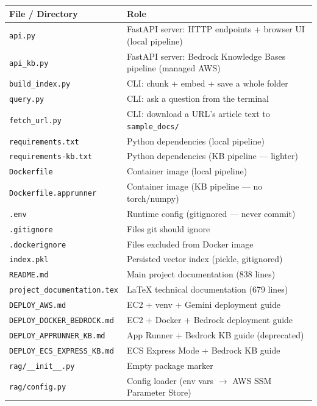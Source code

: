 \documentclass[11pt,a4paper]{paper}
\begin{document}
\begin{table}[h]
\centering
\small
\begin{tabular}{>{\ttfamily}p{5.0cm} >{\raggedright\arraybackslash}p{9.5cm}}
\toprule
\textbf{File / Directory} & \textbf{Role} \\
\midrule
\texttt{api.py} & FastAPI server: HTTP endpoints + browser UI (local pipeline) \\
\texttt{api\_kb.py} & FastAPI server: Bedrock Knowledge Bases pipeline (managed AWS) \\
\texttt{build\_index.py} & CLI: chunk + embed + save a whole folder \\
\texttt{query.py} & CLI: ask a question from the terminal \\
\texttt{fetch\_url.py} & CLI: download a URL's article text to \texttt{sample\_docs/} \\
\texttt{requirements.txt} & Python dependencies (local pipeline) \\
\texttt{requirements-kb.txt} & Python dependencies (KB pipeline — lighter) \\
\texttt{Dockerfile} & Container image (local pipeline) \\
\texttt{Dockerfile.apprunner} & Container image (KB pipeline — no torch/numpy) \\
\texttt{.env} & Runtime config (gitignored — never commit) \\
\texttt{.gitignore} & Files git should ignore \\
\texttt{.dockerignore} & Files excluded from Docker image \\
\texttt{index.pkl} & Persisted vector index (pickle, gitignored) \\
\texttt{README.md} & Main project documentation (838 lines) \\
\texttt{project\_documentation.tex} & LaTeX technical documentation (679 lines) \\
\texttt{DEPLOY\_AWS.md} & EC2 + venv + Gemini deployment guide \\
\texttt{DEPLOY\_DOCKER\_BEDROCK.md} & EC2 + Docker + Bedrock deployment guide \\
\texttt{DEPLOY\_APPRUNNER\_KB.md} & App Runner + Bedrock KB guide (deprecated) \\
\texttt{DEPLOY\_ECS\_EXPRESS\_KB.md} & ECS Express Mode + Bedrock KB guide \\
\texttt{rag/\_\_init\_\_.py} & Empty package marker \\
\texttt{rag/config.py} & Config loader (env vars $\rightarrow$ AWS SSM Parameter Store) \\

\end{tabular}
\end{table}
\end{document}
